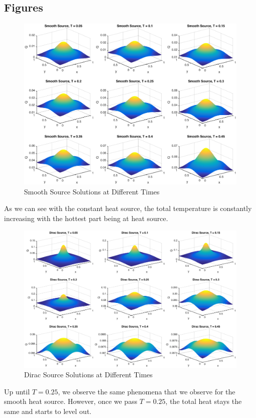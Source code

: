 \subsection{Figures}
\begin{figure}[!htb]
\centering
\includegraphics[scale=.5]{smoothSource4_1.eps}
\caption{Smooth Source Solutions at Different Times}
\label{fig:digraph}
\end{figure}
As we can see with the constant heat source, the total temperature is constantly increasing with the hottest part being at heat source.
\begin{figure}[!htb]
\centering
\includegraphics[scale=.5]{diracSource4_1.eps}
\caption{Dirac Source Solutions at Different Times}
\label{fig:digraph}
\end{figure}
Up until $T=0.25$, we observe the same phenomena that we observe for the smooth heat source. However, once we pass $T=0.25$, the total heat stays the same and starts to level out. 
